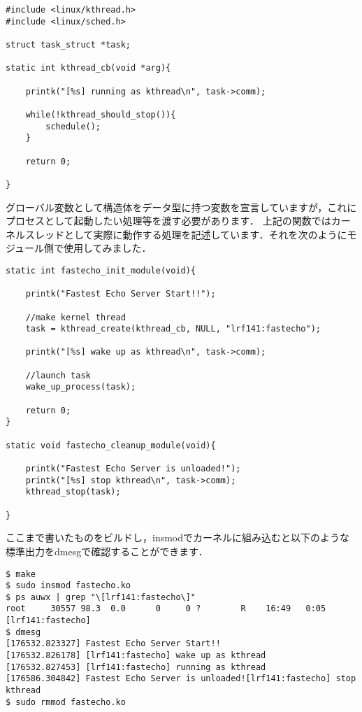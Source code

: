 \begin{verbatim}
#include <linux/kthread.h>
#include <linux/sched.h>

struct task_struct *task;

static int kthread_cb(void *arg){

    printk("[%s] running as kthread\n", task->comm);

    while(!kthread_should_stop()){
        schedule();
    }

    return 0;

}
\end{verbatim}

グローバル変数として構造体をデータ型に持つ変数を宣言していますが，これにプロセスとして起動したい処理等を渡す必要があります．
上記の関数ではカーネルスレッドとして実際に動作する処理を記述しています．それを次のようにモジュール側で使用してみました．

\begin{verbatim}
static int fastecho_init_module(void){

    printk("Fastest Echo Server Start!!");

    //make kernel thread
    task = kthread_create(kthread_cb, NULL, "lrf141:fastecho");
        
    printk("[%s] wake up as kthread\n", task->comm);

    //launch task
    wake_up_process(task);
        
    return 0;
}

static void fastecho_cleanup_module(void){

    printk("Fastest Echo Server is unloaded!");
    printk("[%s] stop kthread\n", task->comm);
    kthread_stop(task);

}
\end{verbatim}

ここまで書いたものをビルドし，insmodでカーネルに組み込むと以下のような標準出力をdmesgで確認することができます．
\begin{verbatim}
$ make
$ sudo insmod fastecho.ko
$ ps auwx | grep "\[lrf141:fastecho\]"
root     30557 98.3  0.0      0     0 ?        R    16:49   0:05 [lrf141:fastecho]
$ dmesg
[176532.823327] Fastest Echo Server Start!!
[176532.826178] [lrf141:fastecho] wake up as kthread
[176532.827453] [lrf141:fastecho] running as kthread
[176586.304842] Fastest Echo Server is unloaded![lrf141:fastecho] stop kthread
$ sudo rmmod fastecho.ko
\end{verbatim}

